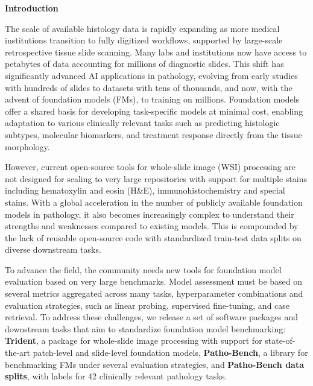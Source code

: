 \clearpage
\noindent\textbf{\large{Introduction}} \label{sec:intro}

The scale of available histology data is rapidly expanding as more medical institutions transition to fully digitized workflows, supported by large-scale retrospective tissue slide scanning. Many labs and institutions now have access to petabytes of data accounting for millions of diagnostic slides. This shift has significantly advanced AI applications in pathology, evolving from early studies with hundreds of slides\cite{bejnordi2017diagnostic} to datasets with tens of thousands\cite{bulten2022artificial}, and now, with the advent of foundation models (FMs)\cite{chen2024towards,vorontsov2024foundation,xu2024whole}, to training on millions. Foundation models offer a shared basis for developing task-specific models at minimal cost, enabling adaptation to various clinically relevant tasks such as predicting histologic subtypes, molecular biomarkers, and treatment response directly from the tissue morphology\cite{kather2020pan,lu2021ai}.

However, current open-source tools for whole-slide image (WSI) processing are not designed for scaling to very large repositories with support for multiple stains including hematoxylin and eosin (H\&E), immunohistochemistry and special stains\cite{pocock2022tiatoolbox,elnahhas2025stamp}. With a global acceleration in the number of publicly available foundation models in pathology, it also becomes increasingly complex to understand their strengths and weaknesses compared to existing models. This is compounded by the lack of reusable open-source code with standardized train-test data splits on diverse downstream tasks. 

To advance the field, the community needs new tools for foundation model evaluation based on very large benchmarks. Model assessment must be based on several metrics aggregated across many tasks, hyperparameter combinations and evaluation strategies, such as linear probing, supervised fine-tuning, and case retrieval. To address these challenges, we release a set of software packages and downstream tasks that aim to standardize foundation model benchmarking: \textbf{Trident}, a package for whole-slide image processing with support for state-of-the-art patch-level and slide-level foundation models\cite{wang2024chief,shaikovski2024prism,vaidya2024amolecular,ding2024titan}, \textbf{Patho-Bench}, a library for benchmarking FMs under several evaluation strategies, and \textbf{Patho-Bench data splits}, with labels for 42 clinically relevant pathology tasks.


